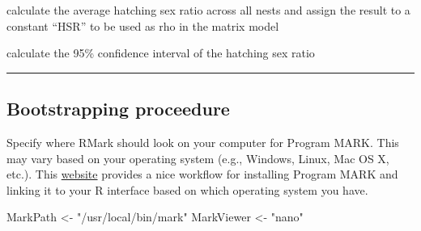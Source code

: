 \documentclass[]{article}
\newenvironment{Shaded}{\begin{snugshade}}{\end{snugshade}}
\newcommand{\KeywordTok}[1]{\textcolor[rgb]{0.13,0.29,0.53}{\textbf{{#1}}}}
\newcommand{\FloatTok}[1]{\textcolor[rgb]{0.00,0.00,0.81}{{#1}}}
\newcommand{\StringTok}[1]{\textcolor[rgb]{0.31,0.60,0.02}{{#1}}}
\newcommand{\CommentTok}[1]{\textcolor[rgb]{0.56,0.35,0.01}{\textit{{#1}}}}
\newcommand{\NormalTok}[1]{{#1}}
\begin{document}
calculate the average hatching sex ratio across all nests and assign the
result to a constant ``HSR'' to be used as rho in the matrix model

\begin{Shaded}
\end{Shaded}

calculate the 95\% confidence interval of the hatching sex ratio

\begin{Shaded}
\end{Shaded}

\begin{center}\rule{0.5\linewidth}{\linethickness}\end{center}

\subsection{Bootstrapping proceedure}\label{bootstrapping-proceedure}

Specify where RMark should look on your computer for Program MARK. This
may vary based on your operating system (e.g., Windows, Linux, Mac OS X,
etc.). This \href{http://www.phidot.org/software/mark/rmark/}{website}
provides a nice workflow for installing Program MARK and linking it to
your R interface based on which operating system you have.

\begin{Shaded}
\begin{Highlighting}[]
\NormalTok{MarkPath <-}\StringTok{ "/usr/local/bin/mark"}
\NormalTok{MarkViewer <-}\StringTok{ "nano"}
\end{Highlighting}
\end{Shaded}
\end{document}
